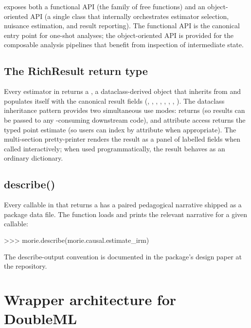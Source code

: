 \documentclass[article,shortnames,nojss]{jss}
\begin{document}
 exposes both a functional API (the
 family of free functions) and an
object-oriented API (a single  class that
internally orchestrates estimator selection, nuisance estimation,
and result reporting). The functional API is the canonical entry
point for one-shot analyses; the object-oriented API is provided
for the composable analysis pipelines that benefit from inspection
of intermediate state.

\subsection{The RichResult return type}

Every estimator in  returns a , a
dataclass-derived object that inherits from  and
populates itself with the canonical result fields
(, , , ,
, , , ).
The dataclass inheritance pattern provides two simultaneous use
modes:  returns  (so
results can be passed to any -consuming downstream
code), and  attribute access returns the
typed point estimate (so users can index by attribute when
appropriate). The multi-section pretty-printer renders the result
as a panel of labelled fields when called interactively; when
used programmatically, the result behaves as an ordinary
dictionary.

\subsection{describe()}

Every callable in  that returns a 
has a paired  pedagogical narrative
shipped as a package data file. The 
function loads and prints the relevant narrative for a given
callable:

\begin{Code}
>>> morie.describe(morie.causal.estimate_irm)
\end{Code}

\noindent The describe-output convention is documented in the
package's design paper at the repository.

\section{Wrapper architecture for DoubleML}
\label{sec:wrapper}
\end{document}
